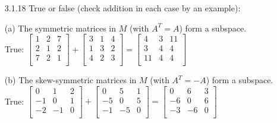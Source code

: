 \documentclass[10pt,twoside,reqno]{article}
\begin{document}
\begin{enumerate}
\vspace{3mm}
\item[3.1.18] True or false (check addition in each case by an example): \\ \vspace{1mm}
{\addtolength{\leftskip}{5mm}
(a) The symmetric matrices in $M$ (with $A^T = A$) form a subspace. \\ \vspace{1mm}
\vspace{3mm}
True:
$
$$
\begin{bmatrix}
1&2&7\\
2&1&2\\
7&2&1\\
\end{bmatrix}
+
\begin{bmatrix}
3&1&4\\
1&3&2\\
4&2&3\\
\end{bmatrix}
=
\begin{bmatrix}
4&3&11\\
3&4&4\\
11&4&4\\
\end{bmatrix}
$$
$

\vspace{3mm}
(b) The skew-symmetric matrices in $M$ (with $A^T = -A$) form a subspace. \\ \vspace{1mm}
\vspace{3mm}
True:
$
$$
\begin{bmatrix}
0&1&2\\
-1&0&1\\
-2&-1&0\\
\end{bmatrix}
+
\begin{bmatrix}
0&5&1\\
-5&0&5\\
-1&-5&0\\
\end{bmatrix}
=
\begin{bmatrix}
0&6&3\\
-6&0&6\\
-3&-6&0\\
\end{bmatrix}
$$
$

}
\end{enumerate}
\end{document}
